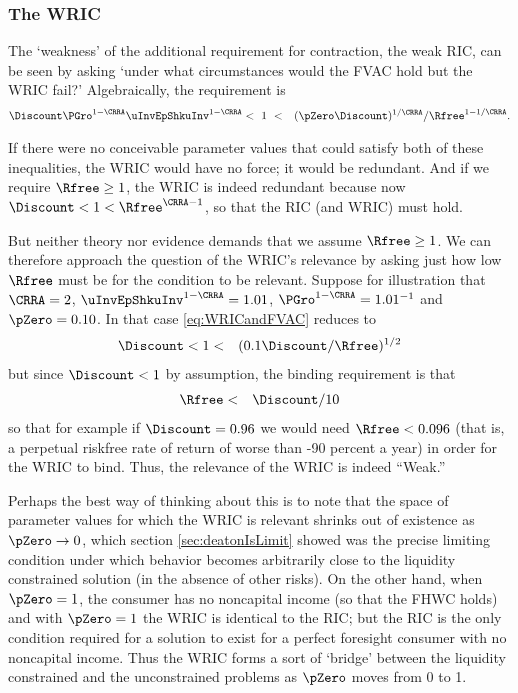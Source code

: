 \documentclass[titlepage]{\econtex}\providecommand{\texname}{BufferStockTheory}%
\begin{document}
\subsubsection{The WRIC}

The `weakness' of the additional requirement for contraction, the
weak RIC, can be seen by asking `under what circumstances
would the FVAC hold but the WRIC fail?'
Algebraically, the requirement is
\begin{eqnarray}
 \Discount \PGro^{1-\CRRA}\uInvEpShkuInv^{1-\CRRA} & < ~ 1 ~ < & (\pZero \Discount)^{1/\CRRA}/\Rfree^{1-1/\CRRA}. \label{eq:WRICandFVAC}
\end{eqnarray}

If there were no conceivable parameter values that could satisfy both
of these inequalities, the WRIC would have no force; it would be
redundant.  And if we require $\Rfree \geq 1$, the WRIC is indeed
redundant because now $\Discount <1<\Rfree^{\CRRA-1}$, so that the RIC (and WRIC) must hold.

But neither theory nor evidence demands that we assume $\Rfree \geq
1$.  We can therefore approach the question of the WRIC's relevance by
asking just how low $\Rfree$ must be for the condition to be relevant.
Suppose for illustration that $\CRRA=2$, $\uInvEpShkuInv^{1-\CRRA}=1.01$,
$\PGro^{1-\CRRA}=1.01^{-1}$ and $\pZero = 0.10$.  In that case
\eqref{eq:WRICandFVAC} reduces to
\begin{eqnarray}
  \Discount  & < 1 < & (0.1 \Discount/\Rfree)^{1/2} \notag
\end{eqnarray}
but since $\Discount < 1$ by assumption, the binding requirement is that
\begin{eqnarray}
  \Rfree & < & \Discount/10 \notag
\end{eqnarray}
so that for example if $\Discount=0.96$ we would need $\Rfree < 0.096$
(that is, a perpetual riskfree rate of return of worse than -90
percent a year) in order for the WRIC to bind.
Thus, the relevance of the WRIC is indeed ``Weak.''

Perhaps the best way of thinking about this is to note that the space
of parameter values for which the WRIC is relevant shrinks out of
existence as $\pZero \rightarrow 0$, which section
\ref{sec:deatonIsLimit} showed was the precise limiting condition
under which behavior becomes arbitrarily close to the liquidity
constrained solution (in the absence of other risks).  On the other
hand, when $\pZero = 1$, the consumer has no noncapital income (so
that the FHWC holds) and with $\pZero=1$ the WRIC is identical to the
RIC; but the RIC is
 the only condition required for a solution to exist
for a perfect foresight consumer with no noncapital income.  Thus the
WRIC forms a sort of `bridge' between the liquidity constrained and
the unconstrained problems as $\pZero$ moves from 0 to 1.
\end{document}
